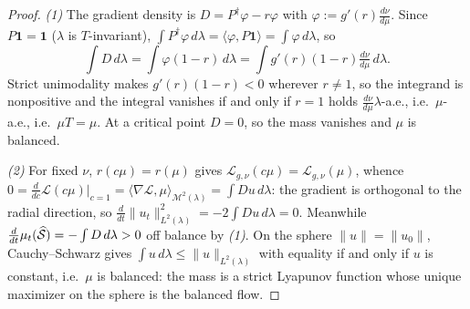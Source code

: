 \begin{proof}
\emph{(1)} The gradient density is $D=P^\dagger\varphi-r\varphi$ with $\varphi:=g'(r)\frac{d\nu}{d\mu}$. Since $P\mathbf1=\mathbf1$ ($\lambda$ is $T$-invariant), $\int P^\dagger\varphi\,d\lambda=\langle\varphi,P\mathbf1\rangle=\int\varphi\,d\lambda$, so
\begin{equation*}
    \int D\,d\lambda=\int\varphi(1-r)\,d\lambda=\int g'(r)(1-r)\tfrac{d\nu}{d\mu}\,d\lambda .
\end{equation*}
Strict unimodality makes $g'(r)(1-r)<0$ wherever $r\neq1$, so the integrand is nonpositive and the integral vanishes if and only if $r=1$ holds $\frac{d\nu}{d\mu}\lambda$-a.e., i.e.\ $\mu$-a.e., i.e.\ $\mu T=\mu$. At a critical point $D=0$, so the mass vanishes and $\mu$ is balanced.

\emph{(2)} For fixed $\nu$, $r(c\mu)=r(\mu)$ gives $\mathcal L_{g,\nu}(c\mu)=\mathcal L_{g,\nu}(\mu)$, whence $0=\frac{d}{dc}\mathcal L(c\mu)|_{c=1}=\langle\nabla\mathcal L,\mu\rangle_{\mathcal M^2(\lambda)}=\int Du\,d\lambda$: the gradient is orthogonal to the radial direction, so $\frac d{dt}\|u_t\|^2_{L^2(\lambda)}=-2\int Du\,d\lambda=0$. Meanwhile $\frac d{dt}\mu_t(\widehat{\mathcal S})=-\int D\,d\lambda>0$ off balance by \emph{(1)}. On the sphere $\|u\|=\|u_0\|$, Cauchy--Schwarz gives $\int u\,d\lambda\leq\|u\|_{L^2(\lambda)}$ with equality if and only if $u$ is constant, i.e.\ $\mu$ is balanced: the mass is a strict Lyapunov function whose unique maximizer on the sphere is the balanced flow.


\end{proof}

